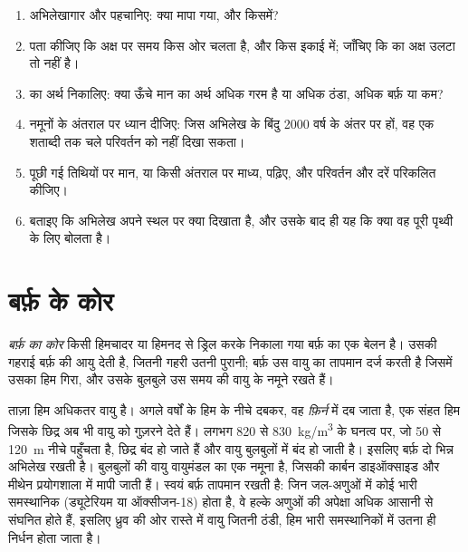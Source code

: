 \begin{method}[किसी प्रॉक्सी अभिलेख को पढ़ना]
\begin{enumerate}
  \item अभिलेखागार और  पहचानिए: क्या मापा गया, और किसमें?
  \item पता कीजिए कि अक्ष पर समय किस ओर चलता है, और किस इकाई में; जाँचिए
        कि  का अक्ष उलटा तो नहीं है।
  \item {} का अर्थ निकालिए: क्या ऊँचे मान का अर्थ अधिक गरम है या अधिक ठंडा,
        अधिक बर्फ़ या कम?
  \item नमूनों के अंतराल पर ध्यान दीजिए: जिस अभिलेख के बिंदु
        \num{2000} वर्ष के अंतर पर हों, वह एक शताब्दी तक चले परिवर्तन को नहीं दिखा सकता।
  \item पूछी गई तिथियों पर मान, या किसी अंतराल पर माध्य, पढ़िए,
        और परिवर्तन और दरें परिकलित कीजिए।
  \item बताइए कि अभिलेख अपने स्थल पर क्या दिखाता है, और उसके बाद ही यह कि क्या वह
        पूरी पृथ्वी के लिए बोलता है।
\end{enumerate}
\end{method}

\section{बर्फ़ के कोर}

\begin{definition}[बर्फ़ का कोर]\label{def:g12:past-climates:ice-core}
\emph{बर्फ़ का कोर} किसी हिमचादर या हिमनद से ड्रिल करके
निकाला गया बर्फ़ का एक बेलन है। उसकी गहराई बर्फ़ की आयु देती है, जितनी गहरी उतनी पुरानी;
बर्फ़ उस वायु का तापमान दर्ज करती है जिसमें उसका हिम गिरा, और उसके
बुलबुले उस समय की वायु के नमूने रखते हैं।
\end{definition}

ताज़ा हिम अधिकतर वायु है। अगले वर्षों के हिम के नीचे दबकर, वह
\emph{फ़िर्न} में दब जाता है, एक संहत हिम जिसके छिद्र अब भी वायु को गुज़रने देते हैं।
लगभग 820 से \qty{830}{kg/m^3} के घनत्व पर, जो 50 से \qty{120}{m}
नीचे पहुँचता है, छिद्र बंद हो जाते हैं और वायु बुलबुलों में बंद हो जाती है। इसलिए बर्फ़ दो भिन्न
अभिलेख रखती है। बुलबुलों की वायु वायुमंडल का एक नमूना है, जिसकी कार्बन
डाइऑक्साइड और मीथेन प्रयोगशाला में मापी जाती हैं। स्वयं बर्फ़ तापमान
रखती है: जिन जल-अणुओं में कोई भारी समस्थानिक (ड्यूटेरियम या
ऑक्सीजन-18) होता है, वे हल्के अणुओं की अपेक्षा अधिक आसानी से संघनित होते हैं, इसलिए ध्रुव
की ओर रास्ते में वायु जितनी ठंडी, हिम भारी समस्थानिकों में उतना ही निर्धन होता जाता है।

